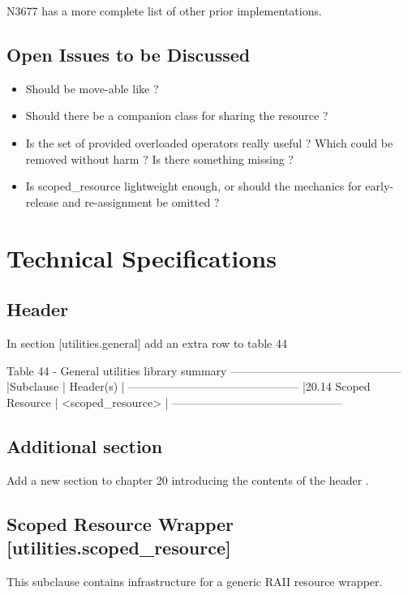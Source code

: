 \documentclass[ebook,11pt,article]{memoir}
\begin{document}
N3677 has a more complete list of other prior implementations.

\section{Open Issues to be Discussed}
\begin{itemize}
\item Should  be move-able like  ?
\item Should there be a companion class for sharing the resource  ? 
\item Is the set of provided overloaded operators really useful ? Which could be removed without harm ? Is there something missing ?
\item Is scoped_resource lightweight enough, or should the mechanics for early-release and re-assignment be omitted ?
\end{itemize}


\chapter{Technical Specifications}
\section{Header}
In section [utilities.general] add an extra row to table 44 
\begin{codeblock}
Table 44 - General utilities library summary
---------------------------------------------
|Subclause             |  Header(s)         |
---------------------------------------------
|20.14 Scoped Resource | <scoped_resource>  |
---------------------------------------------
\end{codeblock}

\section{Additional section}
Add a new section to chapter 20 introducing the contents of the header .

\section{Scoped Resource Wrapper [utilities.scoped_resource]}
This subclause contains infrastructure for a generic RAII resource wrapper.
\end{document}
